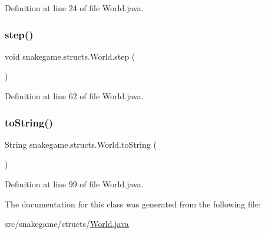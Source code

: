 Definition at line 24 of file World.\+java.

\mbox{\label{classsnakegame_1_1structs_1_1_world_a3da1e90d5d7e475e900171540123c9e3}} 
\subsubsection{\texorpdfstring{step()}{step()}}
{\footnotesize\ttfamily void snakegame.\+structs.\+World.\+step (\begin{DoxyParamCaption}{ }\end{DoxyParamCaption})}



Definition at line 62 of file World.\+java.

\mbox{\label{classsnakegame_1_1structs_1_1_world_a4b6e33ad84c2ab6d5156acb1d32cdcff}} 
\subsubsection{\texorpdfstring{to\+String()}{toString()}}
{\footnotesize\ttfamily String snakegame.\+structs.\+World.\+to\+String (\begin{DoxyParamCaption}{ }\end{DoxyParamCaption})}



Definition at line 99 of file World.\+java.



The documentation for this class was generated from the following file\+:\begin{DoxyCompactItemize}
\item 
src/snakegame/structs/\mbox{\hyperlink{_world_8java}{World.\+java}}\end{DoxyCompactItemize}
